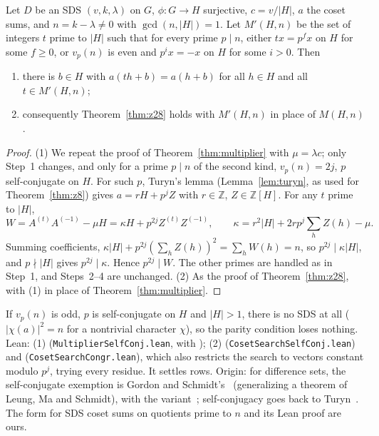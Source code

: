 \begin{theorem}\label{thm:z31}
Let $D$ be an SDS $(v, k, \lambda)$ on $G$, $\phi \colon G \to H$ surjective, $c = v/|H|$, $a$
the coset sums, and $n = k - \lambda \ne 0$ with $\gcd(n, |H|) = 1$. Let $M'(H, n)$ be the set
of integers $t$ prime to $|H|$ such that for every prime $p \mid n$, either $tx = p^f x$ on $H$
for some $f \ge 0$, or $v_p(n)$ is even and $p^i x = -x$ on $H$ for some $i > 0$. Then
\begin{enumerate}
\item there is $b \in H$ with $a(th + b) = a(h + b)$ for all $h \in H$ and all
  $t \in M'(H, n)$;
\item consequently Theorem~\ref{thm:z28} holds with $M'(H, n)$ in place of $M(H, n)$.
\end{enumerate}
\end{theorem}

\begin{proof}
(1) We repeat the proof of Theorem~\ref{thm:multiplier} with $\mu = \lambda c$; only Step~1
changes, and only for a prime $p \mid n$ of the second kind, $v_p(n) = 2j$, $p$
self-conjugate on $H$. For such $p$, Turyn's lemma (Lemma~\ref{lem:turyn}, as used for
Theorem~\ref{thm:z8}) gives $a = rH + p^j Z$ with $r \in \mathbb{Z}$, $Z \in \mathbb{Z}[H]$. For any
$t$ prime to $|H|$,
\[
  W = A^{(t)}A^{(-1)} - \mu H = \kappa H + p^{2j} Z^{(t)}Z^{(-1)}, \qquad
  \kappa = r^2|H| + 2rp^j\textstyle\sum_h Z(h) - \mu .
\]
Summing coefficients, $\kappa|H| + p^{2j}(\sum_h Z(h))^2 = \sum_h W(h) = n$, so
$p^{2j} \mid \kappa |H|$, and $p \nmid |H|$ gives $p^{2j} \mid \kappa$. Hence $p^{2j} \mid W$.
The other primes are handled as in Step~1, and Steps~2--4 are unchanged.
(2) As the proof of Theorem~\ref{thm:z28}, with (1) in place of Theorem~\ref{thm:multiplier}.
\end{proof}

\begin{remark}
If $v_p(n)$ is odd, $p$ is self-conjugate on $H$ and $|H| > 1$, there is no SDS at all
($|\chi(a)|^2 = n$ for a nontrivial character $\chi$), so the parity condition loses nothing.
Lean: (1) 
(\texttt{MultiplierSelfConj.lean}, with ); (2)
 (\texttt{CosetSearchSelfConj.lean}) and
 (\texttt{CosetSearchCongr.lean}), which also restricts the
search to vectors constant modulo $p^j$, trying every residue. It settles  rows.
Origin: for difference sets, the self-conjugate exemption is Gordon and
Schmidt's~\cite[Thm.~3.1]{gordon-schmidt} (generalizing a theorem of Leung, Ma and Schmidt),
with the variant~\cite[Thm.~7]{miller}; self-conjugacy goes back to Turyn~\cite{turyn}. The
form for SDS coset sums on quotients prime to $n$ and its Lean proof are ours.
\end{remark}

